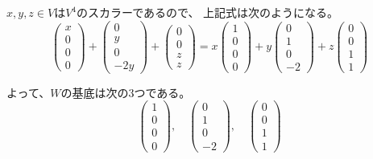 \documentclass[12pt,b5paper]{ltjsarticle}
\begin{document}
$x,y,z\in V$は$V^{4}$のスカラーであるので、
上記式は次のようになる。
\begin{equation}
 \begin{pmatrix} x\\0\\0\\0 \end{pmatrix}
 + \begin{pmatrix} 0\\y\\0\\-2y \end{pmatrix}
 + \begin{pmatrix} 0\\0\\z\\z \end{pmatrix}
 =
  x\begin{pmatrix} 1\\0\\0\\0 \end{pmatrix}
 + y\begin{pmatrix} 0\\1\\0\\-2 \end{pmatrix}
 + z\begin{pmatrix} 0\\0\\1\\1 \end{pmatrix}
\end{equation}

よって、$W$の基底は次の3つである。
\begin{equation}
 \begin{pmatrix} 1\\0\\0\\0 \end{pmatrix},\quad
 \begin{pmatrix} 0\\1\\0\\-2 \end{pmatrix},\quad
 \begin{pmatrix} 0\\0\\1\\1 \end{pmatrix}
\end{equation}
\end{document}
